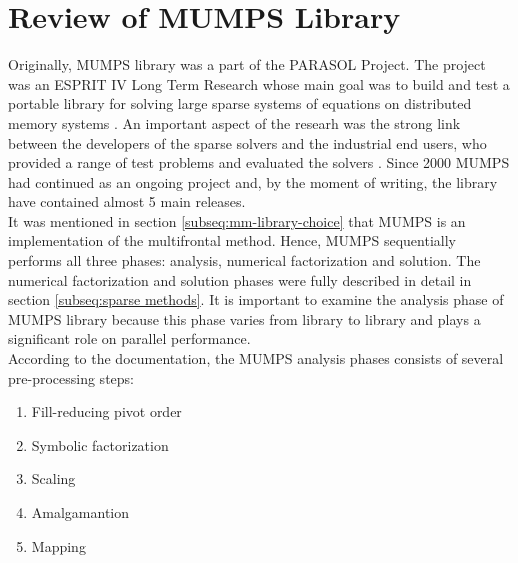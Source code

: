
\section{Review of MUMPS Library}
\label{subseq:mumps-review}

Originally, MUMPS library was a part of the PARASOL Project. The project was an ESPRIT IV Long Term Research whose main goal was to build and test a portable library for solving large sparse systems of equations on distributed memory systems \cite{PARASOL}. An important aspect of the researh was the strong link between the developers of the sparse solvers and the industrial end users, who provided a range of test problems and evaluated the solvers \cite{MUMPS:description}. Since 2000 MUMPS had continued as an ongoing project and, by the moment of writing, the library have contained almost 5 main releases.\\



It was mentioned in section \ref{subseq:mm-library-choice} that MUMPS is an implementation of the multifrontal method. Hence, MUMPS sequentially performs all three phases: analysis, numerical factorization and solution. The numerical factorization and solution phases were fully described in detail in section \ref{subseq:sparse methods}. It is important to examine the analysis phase of MUMPS library because this phase varies from library to library and plays a significant role on parallel performance.\\


According to the documentation, the MUMPS analysis phases consists of several pre-processing steps:

\begin{enumerate}
  \item Fill-reducing pivot order \label{mumps:analysis-steps:1}
  \item Symbolic factorization \label{mumps:analysis-steps:2}
  \item Scaling \label{mumps:analysis-steps:3}
  \item Amalgamantion \label{mumps:analysis-steps:4}
  \item Mapping \label{mumps:analysis-steps:5}
\end{enumerate}


